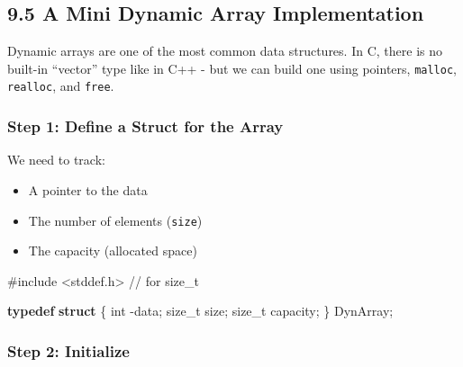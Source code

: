 \documentclass[
  letterpaper,
  DIV=11,
  numbers=noendperiod]{scrreprt}
\newenvironment{Shaded}{\begin{snugshade}}{\end{snugshade}}
\newcommand{\CommentTok}[1]{\textcolor[rgb]{0.37,0.37,0.37}{#1}}
\newcommand{\DataTypeTok}[1]{\textcolor[rgb]{0.68,0.00,0.00}{#1}}
\newcommand{\ImportTok}[1]{\textcolor[rgb]{0.00,0.46,0.62}{#1}}
\newcommand{\KeywordTok}[1]{\textcolor[rgb]{0.00,0.23,0.31}{\textbf{#1}}}
\newcommand{\NormalTok}[1]{\textcolor[rgb]{0.00,0.23,0.31}{#1}}
\newcommand{\OperatorTok}[1]{\textcolor[rgb]{0.37,0.37,0.37}{#1}}
\newcommand{\PreprocessorTok}[1]{\textcolor[rgb]{0.68,0.00,0.00}{#1}}
\providecommand{\tightlist}{%
  \setlength{\itemsep}{0pt}\setlength{\parskip}{0pt}}
\begin{document}
\subsection{9.5 A Mini Dynamic Array
Implementation}\label{a-mini-dynamic-array-implementation}

Dynamic arrays are one of the most common data structures. In C, there
is no built-in ``vector'' type like in C++ - but we can build one using
pointers, \texttt{malloc}, \texttt{realloc}, and \texttt{free}.

\subsubsection{Step 1: Define a Struct for the
Array}\label{step-1-define-a-struct-for-the-array}

We need to track:

\begin{itemize}
\tightlist
\item
  A pointer to the data
\item
  The number of elements (\texttt{size})
\item
  The capacity (allocated space)
\end{itemize}

\begin{Shaded}
\begin{Highlighting}[]
\PreprocessorTok{\#include }\ImportTok{\textless{}stddef.h\textgreater{}}\PreprocessorTok{  }\CommentTok{// for size\_t}

\KeywordTok{typedef} \KeywordTok{struct} \OperatorTok{\{}
    \DataTypeTok{int} \OperatorTok{{-}}\NormalTok{data}\OperatorTok{;}
    \DataTypeTok{size\_t}\NormalTok{ size}\OperatorTok{;}
    \DataTypeTok{size\_t}\NormalTok{ capacity}\OperatorTok{;}
\OperatorTok{\}}\NormalTok{ DynArray}\OperatorTok{;}
\end{Highlighting}
\end{Shaded}

\subsubsection{Step 2: Initialize}\label{step-2-initialize}
\end{document}
